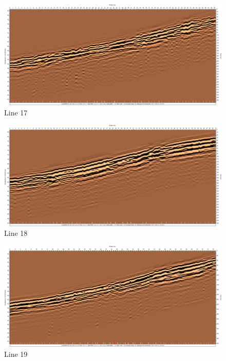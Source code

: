 \begin{figure}[H]
    \centering
    \includegraphics[width=\linewidth]{Images/00_Results/line17.jpg}
    \caption{Line 17}
    \label{fig:line17_}
\end{figure}

\begin{figure}[H]
    \centering
    \includegraphics[width=\linewidth]{Images/00_Results/line18.jpg}
    \caption{Line 18}
    \label{fig:line18_}
\end{figure}

\begin{figure}[H]
    \centering
    \includegraphics[width=\linewidth]{Images/00_Results/line19.jpg}
    \caption{Line 19}
    \label{fig:line19_}
\end{figure}

